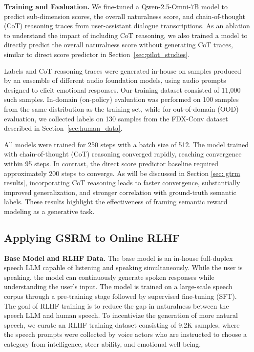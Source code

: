 \textbf{Training and Evaluation.}
\label{sec: gsrm training} We fine-tuned a Qwen-2.5-Omni-7B model to predict sub-dimension scores, the overall naturalness score, and chain-of-thought (CoT) reasoning traces from user-assistant dialogue transcriptions. As an ablation to understand the impact of including CoT reasoning, we also trained a model to directly predict the overall naturalness score without generating CoT traces, similar to direct score predictor in Section~\ref{sec:pilot_studies}.

Labels and CoT reasoning traces were generated in-house on samples produced by an ensemble of different audio foundation models, using audio prompts designed to elicit emotional responses. Our training dataset consisted of 11,000 such samples. In-domain (on-policy) evaluation was performed on 100 samples from the same distribution as the training set, while for out-of-domain (OOD) evaluation, we collected labels on 130 samples from the FDX-Conv dataset described in Section~\ref{sec:human_data}.

All models were trained for 250 steps with a batch size of 512. The model trained with chain-of-thought (CoT) reasoning converged rapidly, reaching convergence within 95 steps. In contrast, the direct score predictor baseline required approximately 200 steps to converge. As will be discussed in Section \ref{sec: gtrm results}, incorporating CoT reasoning leads to faster convergence, substantially improved generalization, and stronger correlation with ground-truth semantic labels. These results highlight the effectiveness of framing semantic reward modeling as a generative task.

\subsection{Applying GSRM to Online RLHF} \label{sec:rlhf_details}
\textbf{Base Model and RLHF Data.} The base model is an in-house full-duplex speech LLM capable of listening and speaking simultaneously. While the user is speaking, the model can continuously generate spoken responses while understanding the user’s input. The model is trained on a large-scale speech corpus through a pre-training stage followed by supervised fine-tuning (SFT). The goal of RLHF training is to reduce the gap in naturalness between the speech LLM and human speech. To incentivize the generation of more natural speech, we curate an RLHF training dataset consisting of 9.2K samples, where the speech prompts were collected by voice actors who are instructed to choose a category from intelligence, steer ability, and emotional well being.

